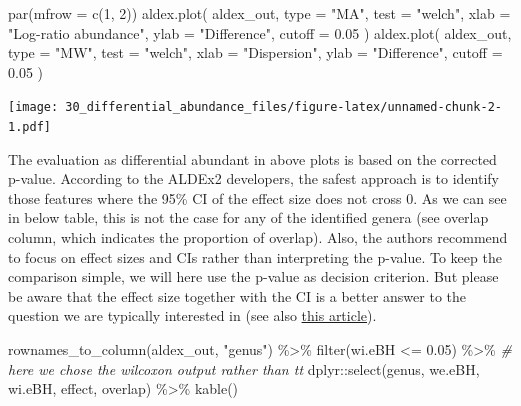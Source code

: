 \documentclass[
]{book}
\newenvironment{Shaded}{\begin{snugshade}}{\end{snugshade}}
\newcommand{\AttributeTok}[1]{\textcolor[rgb]{0.77,0.63,0.00}{#1}}
\newcommand{\CommentTok}[1]{\textcolor[rgb]{0.56,0.35,0.01}{\textit{#1}}}
\newcommand{\DecValTok}[1]{\textcolor[rgb]{0.00,0.00,0.81}{#1}}
\newcommand{\FloatTok}[1]{\textcolor[rgb]{0.00,0.00,0.81}{#1}}
\newcommand{\FunctionTok}[1]{\textcolor[rgb]{0.00,0.00,0.00}{#1}}
\newcommand{\NormalTok}[1]{#1}
\newcommand{\SpecialCharTok}[1]{\textcolor[rgb]{0.00,0.00,0.00}{#1}}
\newcommand{\StringTok}[1]{\textcolor[rgb]{0.31,0.60,0.02}{#1}}
\begin{document}
\begin{Shaded}
\begin{Highlighting}[]
\FunctionTok{par}\NormalTok{(}\AttributeTok{mfrow =} \FunctionTok{c}\NormalTok{(}\DecValTok{1}\NormalTok{, }\DecValTok{2}\NormalTok{))}
  \FunctionTok{aldex.plot}\NormalTok{(}
\NormalTok{    aldex\_out, }
    \AttributeTok{type =} \StringTok{"MA"}\NormalTok{, }
    \AttributeTok{test =} \StringTok{"welch"}\NormalTok{, }
    \AttributeTok{xlab =} \StringTok{"Log{-}ratio abundance"}\NormalTok{,}
    \AttributeTok{ylab =} \StringTok{"Difference"}\NormalTok{,}
    \AttributeTok{cutoff =} \FloatTok{0.05}
\NormalTok{  )}
  \FunctionTok{aldex.plot}\NormalTok{(}
\NormalTok{    aldex\_out, }
    \AttributeTok{type =} \StringTok{"MW"}\NormalTok{, }
    \AttributeTok{test =} \StringTok{"welch"}\NormalTok{,}
    \AttributeTok{xlab =} \StringTok{"Dispersion"}\NormalTok{,}
    \AttributeTok{ylab =} \StringTok{"Difference"}\NormalTok{,}
    \AttributeTok{cutoff =} \FloatTok{0.05}
\NormalTok{  )}
\end{Highlighting}
\end{Shaded}

\texttt{[image: 30\_differential\_abundance\_files/figure-latex/unnamed-chunk-2-1.pdf]}

The evaluation as differential abundant in above plots is based on the
corrected p-value. According to the ALDEx2 developers, the safest
approach is to identify those features where the 95\% CI of the effect
size does not cross 0. As we can see in below table, this is not the
case for any of the identified genera (see overlap column, which
indicates the proportion of overlap). Also, the authors recommend to
focus on effect sizes and CIs rather than interpreting the p-value. To
keep the comparison simple, we will here use the p-value as decision
criterion. But please be aware that the effect size together with the
CI is a better answer to the question we are typically interested in
(see also \href{https://www.nature.com/articles/d41586-019-00857-9}{this
article}).

\begin{Shaded}
\begin{Highlighting}[]
\FunctionTok{rownames\_to\_column}\NormalTok{(aldex\_out, }\StringTok{"genus"}\NormalTok{) }\SpecialCharTok{\%\textgreater{}\%}
  \FunctionTok{filter}\NormalTok{(wi.eBH }\SpecialCharTok{\textless{}=} \FloatTok{0.05}\NormalTok{)  }\SpecialCharTok{\%\textgreater{}\%} \CommentTok{\# here we chose the wilcoxon output rather than tt}
\NormalTok{  dplyr}\SpecialCharTok{::}\FunctionTok{select}\NormalTok{(genus, we.eBH, wi.eBH, effect, overlap) }\SpecialCharTok{\%\textgreater{}\%}
  \FunctionTok{kable}\NormalTok{()}
\end{Highlighting}
\end{Shaded}
\end{document}
